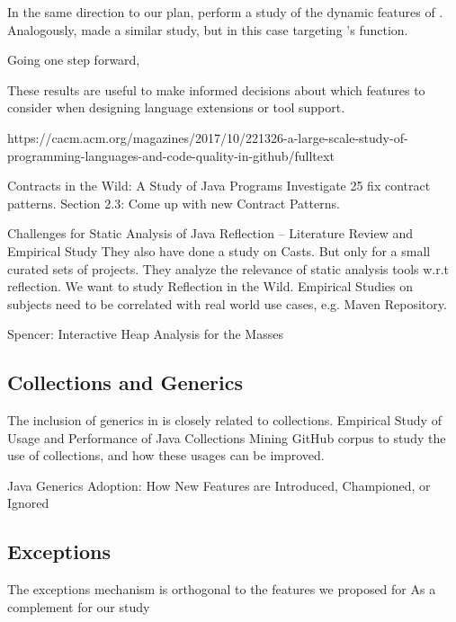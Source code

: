 In the same direction to our plan, \cite{Callau:2011:DUD:1985441.1985448} perform a study of the dynamic features of \smalltalk{}.
Analogously, \cite{Richards:2011:EML:2032497.2032503} made a similar study, but in this case targeting \javascript{}'s \eval{} function.

Going one step forward, \cite{Ray:2017:LSP:3144574.3126905} 

These results are useful to make informed decisions about which features to consider when designing language extensions or tool support.

https://cacm.acm.org/magazines/2017/10/221326-a-large-scale-study-of-programming-languages-and-code-quality-in-github/fulltext



Contracts in the Wild: A Study of Java Programs
Investigate 25 fix contract patterns.
Section 2.3: Come up with new Contract Patterns.
\cite{dietrich_et_al:LIPIcs:2017:7259}

\cite{Landman:2017:CSA:3097368.3097429}
Challenges for Static Analysis of Java Reflection -- Literature Review and Empirical Study
They also have done a study on Casts.
But only for a small curated sets of projects.
They analyze the relevance of static analysis tools w.r.t reflection.
We want to study Reflection in the Wild.
Empirical Studies on subjects need to be correlated with real world use cases, e.g. Maven Repository.



Spencer: Interactive Heap Analysis for the Masses
\cite{DBLP:journals/corr/BrandauerW17}


\subsection*{Collections and Generics}

The inclusion of generics in \java{} is closely related to collections.
Empirical Study of Usage and Performance of Java Collections
Mining GitHub corpus to study the use of collections, and how these usages can be improved.
\cite{Costa:2017:ESU:3030207.3030221}

Java Generics Adoption: How New Features are Introduced, Championed, or Ignored~\cite{Parnin:2011:JGA:1985441.1985446}


\subsection*{Exceptions}

The exceptions mechanism is orthogonal to the features we proposed for 
As a complement for our study

